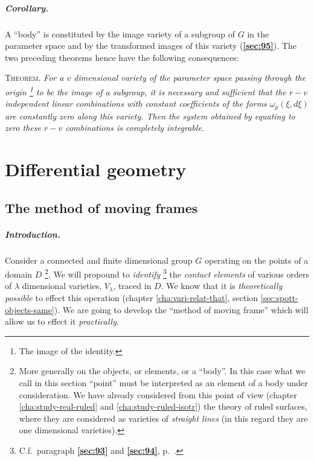 \documentclass[leqno,11pt]{book}
\numberwithin{equation}{chapter}
\theoremstyle{shape1}
\theoremstyle{shapesmall}
\newcommand{\fsref}[1]{{\rm\textsection\textbf{\ref{sec:#1}}}}
\newcommand{\somespace}{\vspace{9pt}}
\begin{document}
\paragraph{Corollary.}
\label{sec:125}
A ``body'' is constituted by the image variety of a subgroup of $G$ in the parameter space and by the transformed images of this variety (\fsref{95}). The two preceding theorems hence have the following consequences:

\somespace

\textsc{Theorem.} \emph{For a $v$ dimensional variety of the parameter space passing through the origin \footnote{The image of the identity.} to be the image of a subgroup, it is necessary and sufficient that the $r-v$ independent linear combinations with constant coefficients of the forms $\omega_{p}(\xi,d\xi)$ are constantly zero along this variety. Then the system obtained by equating to zero these $r-v$ combinations is completely integrable.}

\chapter{Differential geometry}
\label{cha:diff-geom}

\section{The method of moving frames}
\label{sec:method-moving-frames}

\paragraph{Introduction.}
\label{sec:126}
Consider a connected and finite dimensional group $G$ operating on the points of a domain $D$ \footnote{More generally on the objects, or elements, or a ``body''. In this case what we call in this section ``point'' must be interpreted as an element of a body under consideration. We have already considered from this point of view (chapter \ref{cha:study-real-ruled} and \ref{cha:study-ruled-isotr}) the theory of ruled surfaces, where they are considered as varieties of \emph{straight lines} (in this regard they are one dimensional varieties).}. We will propound to \emph{identify} \footnote{C.f.~paragraph \fsref{93} and \fsref{94}, p.~\pageref{sec:93}.} the \emph{contact elements} of various orders of $\lambda$ dimensional varieties, $V_{\lambda}$, traced in $D$. We know that it is \emph{theoretically possible} to effect this operation (chapter \ref{cha:vari-relat-that}, section \ref{sec:spott-objects-same}). We are going to develop the ``method of moving frame'' which will allow us to effect it \emph{practically}.
\end{document}

